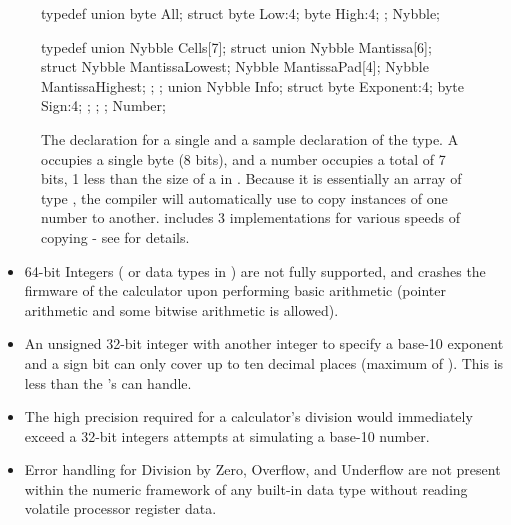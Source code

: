 \documentclass{LibHP20b}
\begin{document}
\begin{figure}[!htbp]
\begin{Code}
typedef union {
	byte All;
	struct {
		byte Low:4;
		byte High:4;
	};
} Nybble;

typedef union {
	Nybble Cells[7];
	struct {
		union {
			Nybble Mantissa[6];
			struct {
				Nybble MantissaLowest;
				Nybble MantissaPad[4];
				Nybble MantissaHighest;
			};
		};
		union {
			Nybble Info;
			struct {
				byte Exponent:4;
				byte Sign:4;
			};
		};
	};
} Number;
\end{Code}
\caption{The declaration for a single  and a sample declaration of the  type. A  occupies a single byte (8 bits), and a number occupies a total of 7 bits, 1 less than the size of a  in . Because it is essentially an array of type , the compiler will automatically use  to copy instances of one number to another. \HP{} includes 3  implementations for various speeds of copying - see  for details.}
\label{fig:nybbleheader}
\end{figure}

\begin{itemize}
\item 64-bit Integers ( or  data types in ) are not fully supported, and crashes the firmware of the calculator upon performing basic arithmetic (pointer arithmetic and some bitwise arithmetic is allowed).
\item An unsigned 32-bit integer with another integer to specify a base-10 exponent and a sign bit can only cover up to ten decimal places (maximum of ). This is less than the \HP[hp]'s \LCD{} can handle.
\item The high precision required for a calculator's division would immediately exceed a 32-bit integers attempts at simulating a base-10 number.
\item Error handling for Division by Zero, Overflow, and Underflow are not present within the numeric framework of any built-in data type without reading volatile processor register data.
\end{itemize}
\end{document}
